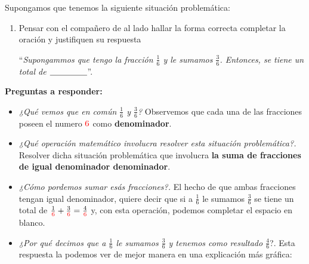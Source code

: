 \documentclass[12pt]{examdesign}
\theoremstyle{plain}
\theoremstyle{definition}
\theoremstyle{remark}
\begin{document}
\begin{endmatter}
		Supongamos que tenemos la siguiente situación problemática:
		\vspace{.4cm}
		\begin{tcolorbox}[colback=red!10!white, colframe=tealgreen, title=\textit{Para pensar}:]
			\def\blank#1{$\underline{\mbox{\hphantom{#1}}}$}
			\begin{enumerate}%
				\item Pensar con el compañero de al lado hallar la forma correcta completar la oración y justifiquen su respuesta
				\begin{center}
					``\textit{Supongammos que tengo la fracción $\frac{1}{6}$ y le sumamos $\frac{3}{6}$. Entonces, se tiene un total de \blank{$\frac{1}{6} + \frac{3}{6}= \frac{4}{6}$}}''.
				\end{center}
			\end{enumerate}%
		\end{tcolorbox}
	 \textbf{Preguntas a responder:} 
	 \begin{itemize}
	 	\item \textit{¿Qué  vemos que en común $\frac{1}{6}$ y  $\frac{3}{6}$?}
	 	Observemos que cada una de las fracciones poseen el numero $\textcolor{red}{6}$ como \textbf{denominador}.
	 	\item \textit{¿Qué operación matemático involucra resolver esta situación problemática?.}
	 	Resolver dicha situación  problemática que involucra \textbf{la suma de  fracciones de igual denominador denominador}.
	 	\item \textit{¿Cómo pordemos sumar esás fracciones?.} El hecho de que ambas fracciones tengan igual denominador, quiere decir que si a $\frac{1}{6}$ le sumamos $\frac{3}{6}$ se tiene un total de $\frac{1}{\textcolor{red}{6}} + \frac{3}{\textcolor{red}{6}}= \frac{4}{\textcolor{red}{6}}$ y, con esta operación, podemos completar el espacio en blanco.
	 	\item \textit{¿Por  qué  decimos  que  a $\frac{1}{6}$ le sumamos $\frac{3}{6}$ y tenemos como resultado $\frac{4}{6}$}?. Esta respuesta la podemos ver de mejor manera en una explicación más gráfica:
	 	

\end{itemize}
\end{endmatter}
\end{document}
